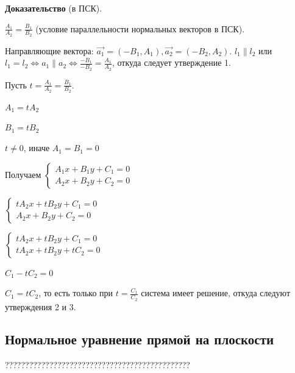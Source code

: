\documentclass[a4paper]{article}
\begin{document}
    \begin{hproof}
        \textbf{Доказательство} (в ПСК).

        $\displaystyle \frac{A_1}{A_2} = \frac{B_1}{B_2}$ (условие параллельности нормальных векторов в ПСК).

        Направляющие вектора: $\vec{a_1} = (-B_1, A_1), \vec{a_2} = (-B_2, A_2)$. \newline $l_1 \parallel l_2$ или $\displaystyle l_1 = l_2 \Leftrightarrow a_1 \parallel a_2 \Leftrightarrow \frac{-B_1}{-B_2} = \frac{A_1}{A_2}$, откуда следует утверждение 1.

        Пусть $t = \frac{A_1}{A_2} = \frac{B_1}{B_2}$.

        $A_1 = tA_2$

        $B_1 = tB_2$

        $t \neq 0$, иначе $A_1 = B_1 = 0$

        Получаем $
        \begin{cases}
            A_1x+B_1y+C_1 = 0
            \\
            A_2x + B_2y+C_2 = 0
        \end{cases}
        $

        $
        \begin{cases}
            tA_2x+tB_2y+C_1 = 0
            \\
            A_2x + B_2y+C_2 = 0
        \end{cases}
        $

        $
        \begin{cases}
            tA_2x+tB_2y+C_1 = 0
            \\
            tA_2x + tB_2y+tC_2 = 0
        \end{cases}
        $

        $C_1 - tC_2 = 0$

        $C_1 = tC_2$, то есть только при $\displaystyle t=\frac{C_1}{C_2}$ система имеет решение, откуда следуют утверждения 2 и 3.
    \end{hproof}


    \newpage \begin{center}
                 \begin{Large}
                 \end{Large}
    \end{center}
    \subsection*{Нормальное уравнение прямой на плоскости}
    ??????????????????????????????????????????????
\end{document}
